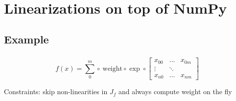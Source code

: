 \documentclass[aspectratio=169,xcolor=dvipsnames]{beamer}
\begin{document}
\section{Linearizations on top of NumPy}  %

\subsection{Example}
\begin{frame}
	\frametitle{\insertsection}
	\framesubtitle{\insertsubsection}


	\begin{equation*}  %
		f(x) =
		\sum_0^m
		\circ
		\ \text{weight}
		\circ
		\exp
		\circ
		\begin{bmatrix}
			x_{00} & \dots & x_{0m} \\
			\vdots & \ddots & \\
			x_{n0} & \dots & x_{nm}
		\end{bmatrix}
	\end{equation*}

	\vspace{1em}
	\begin{center}
		Constraints: skip non-linearities in $J_f$ and always compute weight on the fly
	\end{center}

\end{frame}
\end{document}
